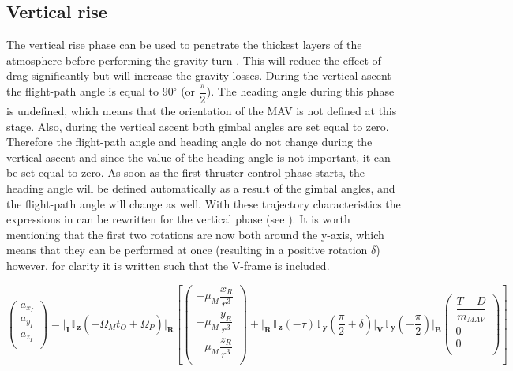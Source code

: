 \subsection{Vertical rise}
\label{subsec:asc_ver_rise}
The vertical rise phase can be used to penetrate the thickest layers of the atmosphere before performing the gravity-turn \cite{fanning1996model,wittenberg2014rocket}. This will reduce the effect of drag significantly but will increase the gravity losses.  During the vertical ascent the flight-path angle is equal to 90$^{\circ}$ (or $\dfrac{\pi}{2}$). The heading angle during this phase is undefined, which means that the orientation of the \ac{MAV} is not defined at this stage. Also, during the vertical ascent both gimbal angles are set equal to zero. Therefore the flight-path angle and heading angle do not change during the vertical ascent and since the value of the heading angle is not important, it can be set equal to zero. As soon as the first thruster control phase starts, the heading angle will be defined automatically as a result of the gimbal angles, and the flight-path angle will change as well. With these trajectory characteristics the expressions in  can be rewritten for the vertical phase (see ). It is worth mentioning that the first two rotations are now both around the y-axis, which means that they can be performed at once (resulting in a positive rotation $\delta$) however, for clarity it is written such that the V-frame is included.


\begin{equation} \label{eq:vert_eom_ascent}
\begin{pmatrix}
a_{x_{I}}\\
a_{y_{I}}\\
a_{z_{I}}\\
\end{pmatrix}
=
\Bigg|_{\mathbf{I}}\mathbb{T}_{\mathbf{z}}\left(-\dot{\Omega}_{M}t_{O}+\Omega_{P}\right)\Bigg|_{\mathbf{R}}\left[
\begin{pmatrix}
-\mu_{M}\dfrac{x_{R}}{r^{3}}\\
-\mu_{M}\dfrac{y_{R}}{r^{3}}\\
-\mu_{M}\dfrac{z_{R}}{r^{3}}\\
\end{pmatrix}
+\Bigg|_{\mathbf{R}}\mathbb{T}_{\mathbf{z}}\left(-\tau\right)\mathbb{T}_{\mathbf{y}}\left(\dfrac{\pi}{2}+\delta\right)\Bigg|_{\mathbf{V}}\mathbb{T}_{\mathbf{y}}\left(-\dfrac{\pi}{2}\right)\Bigg|_{\mathbf{B}}
\begin{pmatrix}
\dfrac{T-D}{m_{MAV}}\\
0\\
0\\
\end{pmatrix}
\right]
\end{equation}

